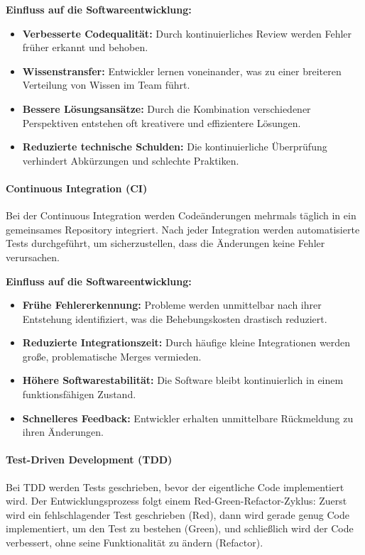 \textbf{Einfluss auf die Softwareentwicklung:}
\begin{itemize}
    \item \textbf{Verbesserte Codequalität:} Durch kontinuierliches Review werden Fehler früher erkannt und behoben.
    \item \textbf{Wissenstransfer:} Entwickler lernen voneinander, was zu einer breiteren Verteilung von Wissen im Team führt.
    \item \textbf{Bessere Lösungsansätze:} Durch die Kombination verschiedener Perspektiven entstehen oft kreativere und effizientere Lösungen.
    \item \textbf{Reduzierte technische Schulden:} Die kontinuierliche Überprüfung verhindert Abkürzungen und schlechte Praktiken.
\end{itemize}

\paragraph{Continuous Integration (CI)}
Bei der Continuous Integration werden Codeänderungen mehrmals täglich in ein gemeinsames Repository integriert. Nach jeder Integration 
werden automatisierte Tests durchgeführt, um sicherzustellen, dass die Änderungen keine Fehler verursachen.

\textbf{Einfluss auf die Softwareentwicklung:}
\begin{itemize}
    \item \textbf{Frühe Fehlererkennung:} Probleme werden unmittelbar nach ihrer Entstehung identifiziert, was die Behebungskosten drastisch reduziert.
    \item \textbf{Reduzierte Integrationszeit:} Durch häufige kleine Integrationen werden große, problematische Merges vermieden.
    \item \textbf{Höhere Softwarestabilität:} Die Software bleibt kontinuierlich in einem funktionsfähigen Zustand.
    \item \textbf{Schnelleres Feedback:} Entwickler erhalten unmittelbare Rückmeldung zu ihren Änderungen.
\end{itemize}

\paragraph{Test-Driven Development (TDD)}
Bei TDD werden Tests geschrieben, bevor der eigentliche Code implementiert wird. Der Entwicklungsprozess folgt 
einem Red-Green-Refactor-Zyklus: Zuerst wird ein fehlschlagender Test geschrieben (Red), dann wird gerade genug Code implementiert,
um den Test zu bestehen (Green), und schließlich wird der Code verbessert, ohne seine Funktionalität zu ändern (Refactor).

